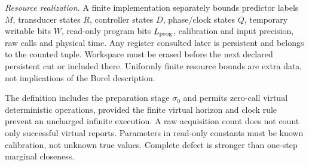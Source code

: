 \begin{definition}
\emph{Resource realization.} A finite implementation separately bounds predictor labels $M$, transducer states $R$, controller states $D$, phase/clock states $Q$, temporary writable bits $W$, read-only program bits $L_{\rm prog}$, calibration and input precision, raw calls and physical time. Any register consulted later is persistent and belongs to the counted tuple. Workspace must be erased before the next declared persistent cut or included there. Uniformly finite resource bounds are extra data, not implications of the Borel description.
\end{definition}

The definition includes the preparation stage $\sigma_0$ and permits zero-call virtual deterministic operations, provided the finite virtual horizon and clock rule prevent an uncharged infinite execution. A raw acquisition count does not count only successful virtual reports. Parameters in read-only constants must be known calibration, not unknown true values. Complete defect is stronger than one-step marginal closeness.

